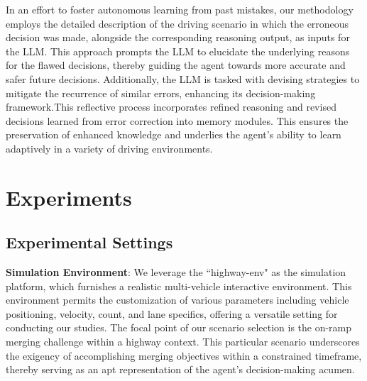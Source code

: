 \documentclass[lettersize,journal]{IEEEtran}
\begin{document}
In an effort to foster autonomous learning from past mistakes, our methodology employs the detailed description of the driving scenario in which the erroneous decision was made, alongside the corresponding reasoning output, as inputs for the LLM. This approach prompts the LLM to elucidate the underlying reasons for the flawed decisions, thereby guiding the agent towards more accurate and safer future decisions. Additionally, the LLM is tasked with devising strategies to mitigate the recurrence of similar errors, enhancing its decision-making framework.This reflective process incorporates refined reasoning and revised decisions learned from error correction into memory modules. This ensures the preservation of enhanced knowledge and underlies the agent's ability to learn adaptively in a variety of driving environments.

\section{Experiments}
\subsection{Experimental Settings}

\textbf{Simulation Environment}: We leverage the ``highway-env" as the simulation platform, which furnishes a realistic multi-vehicle interactive environment\cite{leurent2018environment}. This environment permits the customization of various parameters including vehicle positioning, velocity, count, and lane specifics, offering a versatile setting for conducting our studies. The focal point of our scenario selection is the on-ramp merging challenge within a highway context. This particular scenario underscores the exigency of accomplishing merging objectives within a constrained timeframe, thereby serving as an apt representation of the agent's decision-making acumen.
\end{document}
